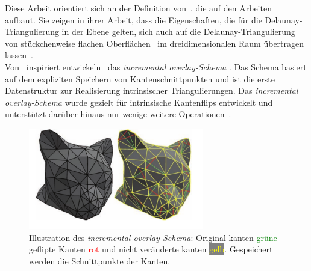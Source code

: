 Diese Arbeit orientiert sich an der Definition von~\citet{Bobenko:2007:LaplaceBeltrami}, die auf den Arbeiten~\cite{boris1934delaunay,indermitte:2001:voronoi,lambert:1994:delaunay} aufbaut. Sie zeigen in ihrer Arbeit, dass die Eigenschaften, die für die Delaunay-Triangulierung in der Ebene gelten, sich auch auf die Delaunay-Triangulierung  von stückchenweise flachen Oberflächen~\cite[Definiton 1] {Bobenko:2007:LaplaceBeltrami}  im dreidimensionalen Raum übertragen lassen~\cite[Definition 3]{Bobenko:2007:LaplaceBeltrami}.\\

Von~\citet{Bobenko:2007:LaplaceBeltrami} inspiriert entwickeln~\citet{Bobenko:2006:SIGGRAPH} das \textit{incremental overlay-Schema} \cite[Abschnitt 2.3]{Bobenko:2006:SIGGRAPH}. Das Schema basiert auf dem expliziten Speichern von Kantenschnittpunkten und ist die erste Datenstruktur zur Realisierung intrinsischer Triangulierungen. Das \textit{incremental overlay-Schema} wurde gezielt für intrinsische Kantenflips entwickelt und unterstützt darüber hinaus nur wenige weitere Operationen~\cite[Abschnitt 2]{Sharp:2019:NIT}. \\
\begin{figure}[ht]%
    \centering
  \includegraphics[width=3in]{images/overlaySchema.png}
  \caption{Illustration des \textit{incremental overlay-Schema}:  Original kanten \textcolor{green}{grüne} geflipte Kanten \textcolor{red}{rot} und nicht veränderte kanten \colorbox{gray}{\textcolor{yellow}{gelb}}. Gespeichert werden die Schnittpunkte der Kanten.  \cite{Bobenko:2006:SIGGRAPH}}
\end{figure}
    

